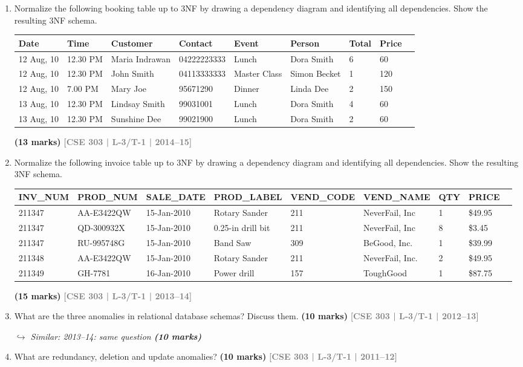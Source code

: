 \documentclass[12pt]{article}
\newcommand{\yr}[1]{\hfill\textcolor{gray}{\small\textbf{[#1]}}}
\newcommand{\mk}[1]{\textcolor{orange!70!black}{\small\textbf{(#1 marks)}}}
\newcommand{\variant}[1]{\par\vspace{1pt}\textcolor{blue!50!black}%
  {\footnotesize\textit{$\hookrightarrow$ Similar: #1}}}
\begin{document}
\begin{enumerate}
\item Normalize the following booking table up to 3NF by drawing a dependency diagram and identifying all dependencies. Show the resulting 3NF schema.

\medskip
\begin{center}
\small
\begin{tabular}{lllllllll}
\toprule
\textbf{Date} & \textbf{Time} & \textbf{Customer} & \textbf{Contact} & \textbf{Event} & \textbf{Person} & \textbf{Total} & \textbf{Price}\\
\midrule
12 Aug, 10 & 12.30 PM & Maria Indrawan & 04222223333 & Lunch & Dora Smith & 6 & 60\\
12 Aug, 10 & 12.30 PM & John Smith & 04113333333 & Master Class & Simon Becket & 1 & 120\\
12 Aug, 10 & 7.00 PM & Mary Joe & 95671290 & Dinner & Linda Dee & 2 & 150\\
13 Aug, 10 & 12.30 PM & Lindsay Smith & 99031001 & Lunch & Dora Smith & 4 & 60\\
13 Aug, 10 & 12.30 PM & Sunshine Dee & 99021900 & Lunch & Dora Smith & 2 & 60\\
\bottomrule
\end{tabular}
\end{center}
\mk{13} \yr{CSE 303 | L-3/T-1 | 2014--15}


\item Normalize the following invoice table up to 3NF by drawing a dependency diagram and identifying all dependencies. Show the resulting 3NF schema.

\medskip
\begin{center}
\small
\begin{tabular}{lllllllll}
\toprule
\textbf{INV\_NUM} & \textbf{PROD\_NUM} & \textbf{SALE\_DATE} & \textbf{PROD\_LABEL} & \textbf{VEND\_CODE} & \textbf{VEND\_NAME} & \textbf{QTY} & \textbf{PRICE}\\
\midrule
211347 & AA-E3422QW & 15-Jan-2010 & Rotary Sander & 211 & NeverFail, Inc & 1 & \$49.95\\
211347 & QD-300932X & 15-Jan-2010 & 0.25-in drill bit & 211 & NeverFail, Inc & 8 & \$3.45\\
211347 & RU-995748G & 15-Jan-2010 & Band Saw & 309 & BeGood, Inc. & 1 & \$39.99\\
211348 & AA-E3422QW & 15-Jan-2010 & Rotary Sander & 211 & NeverFail, Inc. & 2 & \$49.95\\
211349 & GH-7781 & 16-Jan-2010 & Power drill & 157 & ToughGood & 1 & \$87.75\\
\bottomrule
\end{tabular}
\end{center}
\mk{15} \yr{CSE 303 | L-3/T-1 | 2013--14}


\item What are the three anomalies in relational database schemas? Discuss them.
\mk{10} \yr{CSE 303 | L-3/T-1 | 2012--13}
\variant{2013--14: same question \mk{10}}


\item What are redundancy, deletion and update anomalies?
\mk{10} \yr{CSE 303 | L-3/T-1 | 2011--12}


\end{enumerate}
\end{document}
